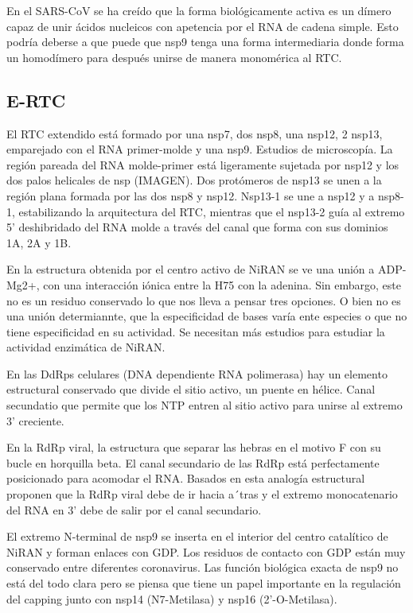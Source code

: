 \documentclass[a4paper,11pt]{report}
\begin{document}
En el SARS-CoV se ha creído que la forma biológicamente activa es un dímero capaz de unir ácidos nucleicos con apetencia por el RNA de cadena simple. Esto podría deberse a que puede que nsp9 tenga una forma intermediaria donde forma un homodímero para después unirse de manera monomérica al RTC.
\cite{eRTC} 

\subsection{E-RTC}
El RTC extendido está formado por una nsp7, dos nsp8, una nsp12, 2 nsp13, emparejado con el RNA primer-molde y una nsp9. Estudios de microscopía.
La región pareada del RNA molde-primer está ligeramente sujetada por nsp12 y los dos palos helicales de nsp (IMAGEN). Dos protómeros de nsp13 se unen a la región plana formada por las dos nsp8 y nsp12. Nsp13-1 se une a nsp12 y a nsp8-1, estabilizando la arquitectura del RTC, mientras que el nsp13-2 guía al extremo 5' deshibridado del RNA molde a través del canal que forma con sus dominios 1A, 2A y 1B.

En la estructura obtenida por \cite{helicasa} el centro activo de NiRAN se ve una unión a ADP-Mg2+, con una interacción iónica entre la H75 con la adenina. Sin embargo, este no es un residuo conservado lo que nos lleva a pensar tres opciones. O bien no es una unión determiannte, que la especificidad de bases varía ente especies o que no tiene especificidad en su actividad. Se necesitan más estudios para estudiar la actividad enzimática de NiRAN.

En las DdRps celulares (DNA dependiente RNA polimerasa) hay un elemento estructural conservado que divide el sitio activo, un puente en hélice. Canal secundatio que permite que los NTP entren al sitio activo para unirse al extremo 3' creciente.

En la RdRp viral, la estructura que separar las hebras en el motivo F con su bucle en horquilla beta. El canal secundario de las RdRp está perfectamente posicionado para acomodar el RNA. Basados en esta analogía estructural \cite{helicasa} proponen que la RdRp viral debe de ir hacia a´tras y el extremo monocatenario del RNA en 3' debe de salir por el canal secundario.


El extremo N-terminal de nsp9 se inserta en el interior del centro catalítico de NiRAN y forman enlaces con GDP. Los residuos de contacto con GDP están muy conservado entre diferentes coronavirus. Las función biológica exacta de nsp9 no está del todo clara pero se piensa que tiene un papel importante en la regulación del capping junto con nsp14 (N7-Metilasa) y nsp16 (2'-O-Metilasa).
\end{document}
